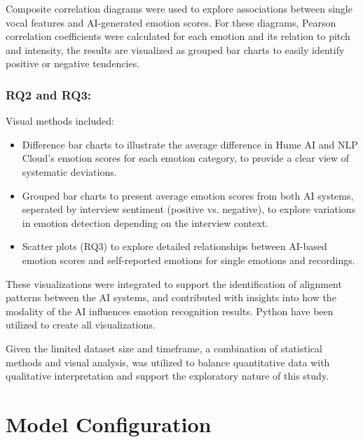 Composite correlation diagrams were used to explore associations between single vocal features and AI-generated emotion scores. 
For these diagrams, Pearson correlation coefficients were calculated for each emotion and its relation to pitch and intensity, the results are visualized as grouped bar charts to easily identify positive or negative tendencies. 

\subsubsection{RQ2 and RQ3:}
Visual methods included: 
\begin{itemize}
    \item Difference bar charts to illustrate the average difference in Hume AI and NLP Cloud's emotion scores for each emotion category, to provide a clear view of systematic deviations. 
    \item Grouped bar charts to present average emotion scores from both AI systems, seperated by interview sentiment (positive vs. negative), to explore variations in emotion detection depending on the interview context. 
    \item Scatter plots (RQ3) to explore detailed relationships between AI-based emotion scores and self-reported emotions for single emotions and recordings.
\end{itemize}
These visualizations were integrated to support the identification of alignment patterns between the AI systems, and contributed with insights into how the modality of the AI influences emotion recognition results. 
Python have been utilized to create all visualizations. 

Given the limited dataset size and timeframe, a combination of statistical methods and visual analysis, was utilized to balance quantitative data with qualitative interpretation and support the exploratory nature of this study. 

\section{Model Configuration}
